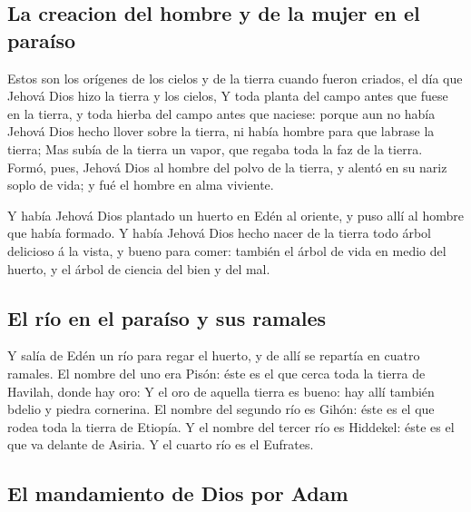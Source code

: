 \hypertarget{la-creacion-del-hombre-y-de-la-mujer-en-el-parauxedso}{%
\subsection{La creacion del hombre y de la mujer en el
paraíso}\label{la-creacion-del-hombre-y-de-la-mujer-en-el-parauxedso}}

 Estos son los orígenes de los cielos y de la tierra
cuando fueron criados, el día que Jehová Dios hizo la tierra y los
cielos,  Y toda planta del campo antes que fuese en la
tierra, y toda hierba del campo antes que naciese: porque aun no había
Jehová Dios hecho llover sobre la tierra, ni había hombre para que
labrase la tierra;  Mas subía de la tierra un vapor, que
regaba toda la faz de la tierra.  Formó, pues, Jehová Dios
al hombre del polvo de la tierra, y alentó en su nariz soplo de vida; y
fué el hombre en alma viviente.

 Y había Jehová Dios plantado un huerto en Edén al
oriente, y puso allí al hombre que había formado.  Y había
Jehová Dios hecho nacer de la tierra todo árbol delicioso á la vista, y
bueno para comer: también el árbol de vida en medio del huerto, y el
árbol de ciencia del bien y del mal.

\hypertarget{el-ruxedo-en-el-parauxedso-y-sus-ramales}{%
\subsection{El río en el paraíso y sus
ramales}\label{el-ruxedo-en-el-parauxedso-y-sus-ramales}}

 Y salía de Edén un río para regar el huerto, y de allí
se repartía en cuatro ramales.  El nombre del uno era
Pisón: éste es el que cerca toda la tierra de Havilah, donde hay oro:
 Y el oro de aquella tierra es bueno: hay allí también
bdelio y piedra cornerina.  El nombre del segundo río es
Gihón: éste es el que rodea toda la tierra de Etiopía.  Y
el nombre del tercer río es Hiddekel: éste es el que va delante de
Asiria. Y el cuarto río es el Eufrates.

\hypertarget{el-mandamiento-de-dios-por-adam}{%
\subsection{El mandamiento de Dios por
Adam}\label{el-mandamiento-de-dios-por-adam}}


